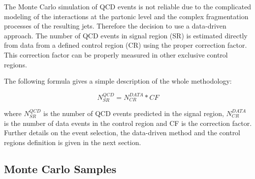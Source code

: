 The Monte Carlo simulation of QCD events is not reliable due to the complicated modeling of the interactions at the partonic level and the complex fragmentation processes of the resulting jets. Therefore the decision to use a data-driven approach. The number of QCD events in signal region (SR) is estimated directly from data from a defined control region (CR) using the proper correction factor. This correction factor can be properly measured in other exclusive control regions. 

The following formula gives a simple description of the whole methodology:

\begin{equation}
N^{QCD}_{SR} =  N^{DATA}_{CR} * CF
\label{eq:qcdbgpred_simple}
\end{equation} 

where $N^{QCD}_{SR}$ is the number of QCD events predicted in the signal region, $N^{DATA}_{CR}$ is the number of data events in the control region and CF is the correction factor. Further details on the event selection, the data-driven method and the control regions definition is given in the next section.

\clearpage

\subsection{Monte Carlo Samples}

